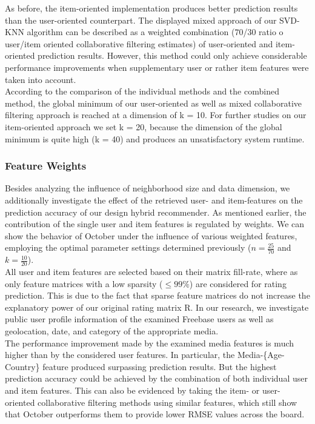 \documentclass[11pt,letterpaper]{article}
\begin{document}
As before, the item-oriented implementation produces better prediction results than the user-oriented counterpart. The displayed mixed approach of our SVD-KNN algorithm can be described as a weighted combination ($70$/$30$ ratio o user/item oriented collaborative filtering estimates) of user-oriented and item-oriented prediction results. However, this method could only achieve considerable performance improvements when supplementary user or rather item features were taken into account.\\

According to the comparison of the individual methods and the combined method, the global minimum of our user-oriented as well as mixed collaborative filtering approach is reached at a dimension of k = 10. For further studies on our item-oriented approach we set k = 20, because the dimension of the global minimum is quite high (k = 40) and produces an unsatisfactory system runtime.

\subsubsection{Feature Weights}

Besides analyzing the influence of neighborhood size and data dimension, we additionally investigate the effect of the retrieved user- and item-features on the prediction accuracy of our design hybrid recommender. As mentioned earlier, the contribution of the single user and item features is regulated by weights. We can show the behavior of October under the influence of various weighted features, employing the optimal parameter settings determined previously ($n = \frac{25}{70}$ and $k=\frac{10}{20}$). \\

All user and item features are selected based on their matrix fill-rate, where as only feature matrices with a low sparsity ($\leq 99\% $) are considered for rating prediction. This is due to the fact that sparse feature matrices do not increase the explanatory power of our original rating matrix R. In our research, we investigate public user profile information of the examined Freebase users as well as geolocation, date, and category of the appropriate media.\\

The performance improvement made by the examined media features is much higher than by the considered user features. In particular, the Media-\{Age-Country\} feature produced surpassing prediction results. But the highest prediction accuracy could be achieved by the combination of both individual user and item features. This can also be evidenced by taking the item- or user-oriented collaborative filtering methods using similar features, which still show that October outperforms them to provide lower RMSE values across the board.
\end{document}

